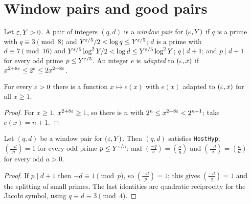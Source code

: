 \section{Window pairs and good pairs}

\begin{definition}\label{host:win-pair}
Let $\varepsilon,Y>0$. A pair of integers $(q,d)$ is a \emph{window pair} for
$(\varepsilon,Y)$ if $q$ is a prime with $q\equiv3\pmod8$ and
$Y^{\varepsilon/5}/2<\log q\le Y^{\varepsilon/5}$; $d$ is a prime with
$d\equiv7\pmod{16}$ and $Y^{\varepsilon/5}\log^2Y/2<\log d\le Y^{\varepsilon/5}\log^2Y$;
$q\mid d+1$; and $p\mid d+1$ for every odd prime $p\le Y^{\varepsilon/5}$. An
integer $e$ is \emph{adapted} to $(\varepsilon,x)$ if
$x^{2+8\varepsilon}\le2^e\le2x^{2+8\varepsilon}$.
\end{definition}

\begin{lemma}\label{host:exists-pagen}
For every $\varepsilon>0$ there is a function $x\mapsto e(x)$ with $e(x)$ adapted
to $(\varepsilon,x)$ for all $x\ge1$.
\end{lemma}
\begin{proof}
For $x\ge1$, $x^{2+8\varepsilon}\ge1$, so there is $n$ with
$2^n\le x^{2+8\varepsilon}<2^{n+1}$; take $e(x)=n+1$.
\end{proof}

\begin{lemma}\label{host:pair-hyp}
Let $(q,d)$ be a window pair for $(\varepsilon,Y)$. Then $(q,d)$ satisfies
\texttt{HostHyp}; $\left(\frac{-d}{p}\right)=1$ for every odd prime
$p\le Y^{\varepsilon/5}$; and $\left(\frac{-q}{a}\right)=\left(\frac aq\right)$ and
$\left(\frac{-d}{a}\right)=\left(\frac ad\right)$ for every odd $a>0$.
\end{lemma}
\begin{proof}
If $p\mid d+1$ then $-d\equiv1\pmod p$, so $\left(\frac{-d}{p}\right)=1$;
this gives $\left(\frac{-d}{q}\right)=1$ and the splitting of small primes.
The last identities are quadratic reciprocity for the Jacobi symbol, using
$q\equiv d\equiv3\pmod4$.
\end{proof}

